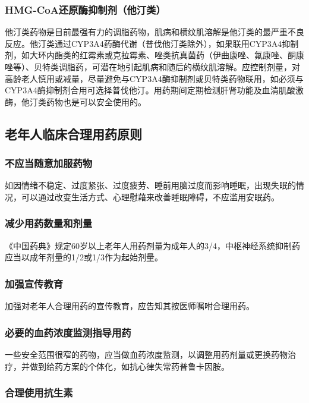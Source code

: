 \subsubsection{HMG-CoA还原酶抑制剂（他汀类）}

他汀类药物是目前最强有力的调脂药物，肌病和横纹肌溶解是他汀类的最严重不良反应。他汀类通过CYP3A4药酶代谢（普伐他汀类除外），如果联用CYP3A4抑制剂，如大环内酯类的红霉素或克拉霉素、唑类抗真菌药（伊曲康唑、氟康唑、酮康唑等）、贝特类调脂药，可潜在地引起肌病和随后的横纹肌溶解。应控制剂量，对高龄老人慎用或减量，尽量避免与CYP3A4酶抑制剂或贝特类药物联用，如必须与CYP3A4酶抑制剂合用可选择普伐他汀。用药期间定期检测肝肾功能及血清肌酸激酶，他汀类药物也是可以安全使用的。

\subsection{老年人临床合理用药原则}

\subsubsection{不应当随意加服药物}

如因情绪不稳定、过度紧张、过度疲劳、睡前用脑过度而影响睡眠，出现失眠的情况，可以通过改变生活方式、心理慰藉来改善睡眠障碍，不应滥用安眠药。

\subsubsection{减少用药数量和剂量}

《中国药典》规定60岁以上老年人用药剂量为成年人的3/4，中枢神经系统抑制药应当以成年剂量的1/2或1/3作为起始剂量。

\subsubsection{加强宣传教育}

加强对老年人合理用药的宣传教育，应告知其按医师嘱咐合理用药。

\subsubsection{必要的血药浓度监测指导用药}

一些安全范围很窄的药物，应当做血药浓度监测，以调整用药剂量或更换药物治疗，并做到给药方案的个体化，如抗心律失常药普鲁卡因胺。

\subsubsection{合理使用抗生素}

